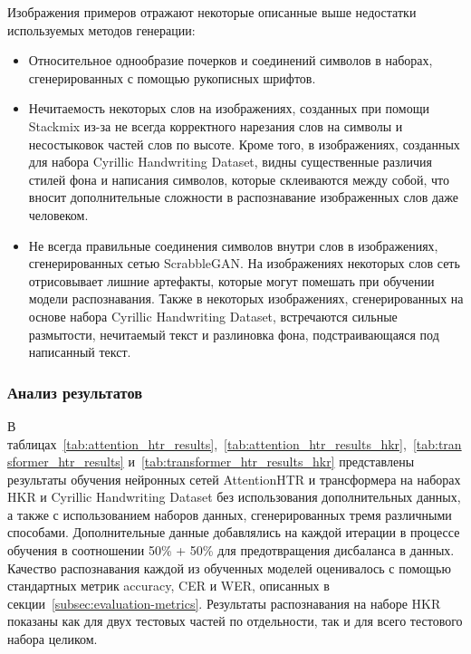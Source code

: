 Изображения примеров отражают некоторые описанные выше недостатки используемых методов генерации:
\begin{itemize}
    \item Относительное однообразие почерков и соединений символов в наборах, сгенерированных с помощью рукописных шрифтов.
    \item Нечитаемость некоторых слов на изображениях, созданных при помощи Stackmix из-за не всегда корректного нарезания
    слов на символы и несостыковок частей слов по высоте.
    Кроме того, в изображениях, созданных для набора Cyrillic Handwriting Dataset, видны существенные различия стилей фона и написания символов,
    которые склеиваются между собой, что вносит дополнительные сложности в распознавание изображенных слов даже человеком.
    \item Не всегда правильные соединения символов внутри слов в изображениях, сгенерированных сетью ScrabbleGAN.
    На изображениях некоторых слов сеть отрисовывает лишние артефакты, которые могут помешать при обучении модели распознавания.
    Также в некоторых изображениях, сгенерированных на основе набора Cyrillic Handwriting Dataset, встречаются сильные размытости, нечитаемый текст и
    разлиновка фона, подстраивающаяся под написанный текст.
\end{itemize}


\subsubsection{Анализ результатов}
\label{subsubsec:experiments_results}


В таблицах~\ref{tab:attention_htr_results},~\ref{tab:attention_htr_results_hkr},~\ref{tab:transformer_htr_results} и~\ref{tab:transformer_htr_results_hkr}
представлены результаты обучения нейронных сетей AttentionHTR и трансформера на наборах HKR и Cyrillic Handwriting Dataset
без использования дополнительных данных, а также с использованием наборов данных, сгенерированных тремя различными способами.
Дополнительные данные добавлялись на каждой итерации в процессе обучения в соотношении 50\% + 50\% для предотвращения дисбаланса в данных.
Качество распознавания каждой из обученных моделей оценивалось с помощью стандартных метрик accuracy, CER и WER, описанных в секции~\ref{subsec:evaluation-metrics}.
Результаты распознавания на наборе HKR показаны как для двух тестовых частей по отдельности, так и для всего тестового набора целиком.


